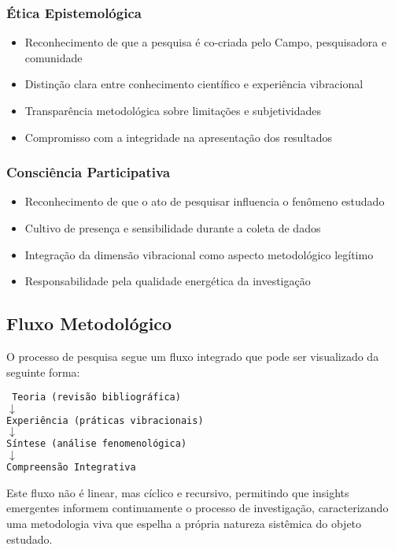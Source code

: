 \subsubsection{Ética Epistemológica}
\begin{itemize}
    \item Reconhecimento de que a pesquisa é co-criada pelo Campo, pesquisadora e comunidade
    \item Distinção clara entre conhecimento científico e experiência vibracional
    \item Transparência metodológica sobre limitações e subjetividades
    \item Compromisso com a integridade na apresentação dos resultados
\end{itemize}

\subsubsection{Consciência Participativa}
\begin{itemize}
    \item Reconhecimento de que o ato de pesquisar influencia o fenômeno estudado
    \item Cultivo de presença e sensibilidade durante a coleta de dados
    \item Integração da dimensão vibracional como aspecto metodológico legítimo
    \item Responsabilidade pela qualidade energética da investigação
\end{itemize}

\subsection{Fluxo Metodológico}

O processo de pesquisa segue um fluxo integrado que pode ser visualizado da seguinte forma:

\begin{center}
\texttt{
Teoria (revisão bibliográfica) \\
$\downarrow$ \\
Experiência (práticas vibracionais) \\
$\downarrow$ \\
Síntese (análise fenomenológica) \\
$\downarrow$ \\
Compreensão Integrativa
}
\end{center}

Este fluxo não é linear, mas cíclico e recursivo, permitindo que insights emergentes informem continuamente o processo de investigação, caracterizando uma metodologia viva que espelha a própria natureza sistêmica do objeto estudado.

\newpage

